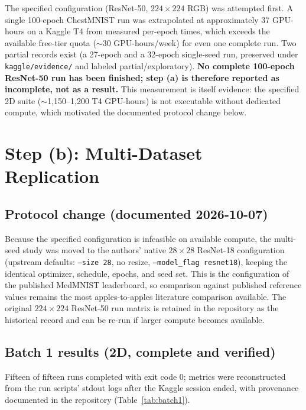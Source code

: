 \documentclass[11pt,a4paper]{article}
\begin{document}
The specified configuration (ResNet-50, $224 \times 224$ RGB) was attempted
first. A single 100-epoch ChestMNIST run was extrapolated at approximately
37 GPU-hours on a Kaggle T4 from measured per-epoch times, which exceeds the
available free-tier quota
($\sim$30 GPU-hours/week) for even one complete run. Two partial records exist
(a 27-epoch and a 32-epoch single-seed run, preserved under
\texttt{kaggle/evidence/} and labeled partial/exploratory). \textbf{No
complete 100-epoch ResNet-50 run has been finished; step (a) is therefore
reported as incomplete, not as a result.} This measurement is itself evidence:
the specified 2D suite ($\sim$1,150--1,200 T4 GPU-hours) is not executable
without dedicated compute, which motivated the documented protocol change
below.

\section{Step (b): Multi-Dataset Replication}

\subsection{Protocol change (documented 2026-10-07)}

Because the specified configuration is infeasible on available compute, the
multi-seed study was moved to the authors' native $28 \times 28$ ResNet-18
configuration (upstream defaults: \texttt{--size 28}, no resize,
\texttt{--model\_flag resnet18}), keeping the identical optimizer, schedule,
epochs, and seed set. This is the configuration of the published MedMNIST
leaderboard, so comparison against published reference values remains the
most apples-to-apples literature comparison available. The original
$224 \times 224$ ResNet-50 run matrix is retained in the repository as the
historical record and can be re-run if larger compute becomes available.

\subsection{Batch 1 results (2D, complete and verified)}

Fifteen of fifteen runs completed with exit code 0; metrics were
reconstructed from the run scripts' stdout logs after the Kaggle session
ended, with provenance documented in the repository
(Table~\ref{tab:batch1}).
\end{document}
